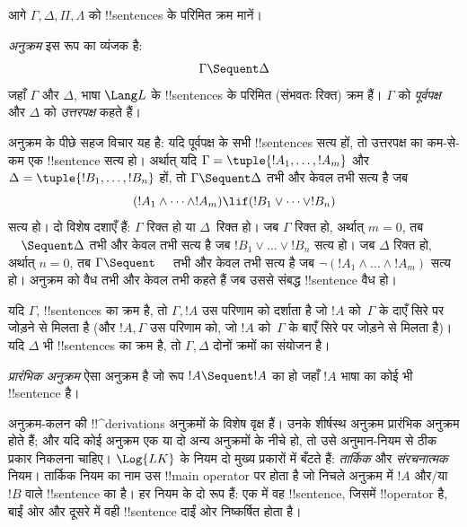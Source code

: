 \documentclass[../../../include/open-logic-section]{subfiles}
\begin{document}
      {}
      {}


आगे $\Gamma, \Delta, \Pi, \Lambda$ को !!{sentence}s के परिमित क्रम मानें।

\begin{defn}[अनुक्रम]
\emph{अनुक्रम} इस रूप का व्यंजक है:
\[
\Gamma \Sequent \Delta
\]
जहाँ $\Gamma$ और $\Delta$, भाषा $\Lang L$ के !!{sentence}s के परिमित
(संभवतः रिक्त) क्रम हैं। $\Gamma$ को \emph{पूर्वपक्ष} और $\Delta$ को
\emph{उत्तरपक्ष} कहते हैं।
\end{defn}

\begin{explain}
अनुक्रम के पीछे सहज विचार यह है: यदि पूर्वपक्ष के सभी !!{sentence}s सत्य हों,
तो उत्तरपक्ष का कम-से-कम एक !!{sentence} सत्य हो। अर्थात् यदि
$\Gamma = \tuple{!A_1, \dots, !A_m}$ और
$\Delta = \tuple{!B_1, \dots, !B_n}$ हों, तो $\Gamma \Sequent \Delta$
तभी और केवल तभी सत्य है जब
\[
(!A_1 \land \cdots \land !A_m) \lif (!B_1 \lor \cdots \lor
!B_n)
\]
सत्य हो। दो विशेष दशाएँ हैं: $\Gamma$ रिक्त हो या $\Delta$~रिक्त हो। जब
$\Gamma$ रिक्त हो, अर्थात् $m = 0$, तब $\quad
\Sequent \Delta$ तभी और केवल तभी सत्य है जब $!B_1 \lor \dots \lor !B_n$
सत्य हो। जब $\Delta$ रिक्त हो, अर्थात् $n = 0$, तब $\Gamma \Sequent \quad$
तभी और केवल तभी सत्य है जब $\lnot(!A_1 \land \dots \land !A_m)$ सत्य हो।
अनुक्रम को वैध तभी और केवल तभी कहते हैं जब उससे संबद्ध !!{sentence} वैध हो।
\end{explain}

यदि $\Gamma$, !!{sentence}s का क्रम है, तो $\Gamma, !A$ उस परिणाम को दर्शाता
है जो $!A$ को~$\Gamma$ के दाएँ सिरे पर जोड़ने से मिलता है (और $!A,
\Gamma$ उस परिणाम को, जो $!A$ को~$\Gamma$ के बाएँ सिरे पर जोड़ने से मिलता
है)। यदि $\Delta$ भी !!{sentence}s का क्रम है, तो $\Gamma,
\Delta$ दोनों क्रमों का संयोजन है।

\begin{defn}[प्रारंभिक अनुक्रम]
\emph{प्रारंभिक अनुक्रम} ऐसा अनुक्रम है जो
{रूप $!A \Sequent !A$ का हो} जहाँ $!A$ भाषा का कोई भी !!{sentence} है।
\end{defn}

अनुक्रम-कलन की !!^{derivation}s अनुक्रमों के विशेष वृक्ष हैं। उनके शीर्षस्थ
अनुक्रम प्रारंभिक अनुक्रम होते हैं; और यदि कोई अनुक्रम एक या दो अन्य अनुक्रमों
के नीचे हो, तो उसे अनुमान-नियम से ठीक प्रकार निकलना चाहिए। $\Log{LK}$ के नियम
दो मुख्य प्रकारों में बँटते हैं: \emph{तार्किक} और \emph{संरचनात्मक} नियम।
तार्किक नियम का नाम उस !!{main
  operator} पर होता है जो निचले अनुक्रम में $!A$ और/या $!B$ वाले !!{sentence}
का है। हर नियम के दो रूप हैं: एक में वह !!{sentence}, जिसमें !!{operator} है,
बाईं ओर और दूसरे में वही !!{sentence} दाईं ओर निष्कर्षित होता है।
\end{document}
